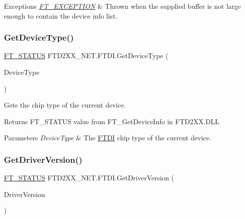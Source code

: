 \begin{DoxyExceptions}{Exceptions}
{\em \mbox{\hyperlink{class_f_t_d2_x_x___n_e_t_1_1_f_t_d_i_1_1_f_t___e_x_c_e_p_t_i_o_n}{F\+T\+\_\+\+E\+X\+C\+E\+P\+T\+I\+ON}}} & Thrown when the supplied buffer is not large enough to contain the device info list.\\
\hline
\end{DoxyExceptions}
\mbox{\label{class_f_t_d2_x_x___n_e_t_1_1_f_t_d_i_a5b346f666a9e8c58b1a0037138f8444f}} 
\subsubsection{\texorpdfstring{GetDeviceType()}{GetDeviceType()}}
{\footnotesize\ttfamily \mbox{\hyperlink{class_f_t_d2_x_x___n_e_t_1_1_f_t_d_i_aabe20ad905cc4ccc1e35dd5b877d9a83}{F\+T\+\_\+\+S\+T\+A\+T\+US}} F\+T\+D2\+X\+X\+\_\+\+N\+E\+T.\+F\+T\+D\+I.\+Get\+Device\+Type (\begin{DoxyParamCaption}\item[{ref \mbox{\hyperlink{class_f_t_d2_x_x___n_e_t_1_1_f_t_d_i_a7f69db13362f65d251d6b16e3eec585f}{F\+T\+\_\+\+D\+E\+V\+I\+CE}}}]{Device\+Type }\end{DoxyParamCaption})}



Gets the chip type of the current device. 

\begin{DoxyReturn}{Returns}
F\+T\+\_\+\+S\+T\+A\+T\+US value from F\+T\+\_\+\+Get\+Device\+Info in F\+T\+D2\+X\+X.\+D\+LL
\end{DoxyReturn}

\begin{DoxyParams}{Parameters}
{\em Device\+Type} & The \mbox{\hyperlink{class_f_t_d2_x_x___n_e_t_1_1_f_t_d_i}{F\+T\+DI}} chip type of the current device.\\
\hline
\end{DoxyParams}
\mbox{\label{class_f_t_d2_x_x___n_e_t_1_1_f_t_d_i_abdca05d9aec4b82efb3a4b08803968ef}} 
\subsubsection{\texorpdfstring{GetDriverVersion()}{GetDriverVersion()}}
{\footnotesize\ttfamily \mbox{\hyperlink{class_f_t_d2_x_x___n_e_t_1_1_f_t_d_i_aabe20ad905cc4ccc1e35dd5b877d9a83}{F\+T\+\_\+\+S\+T\+A\+T\+US}} F\+T\+D2\+X\+X\+\_\+\+N\+E\+T.\+F\+T\+D\+I.\+Get\+Driver\+Version (\begin{DoxyParamCaption}\item[{ref U\+Int32}]{Driver\+Version }\end{DoxyParamCaption})}



